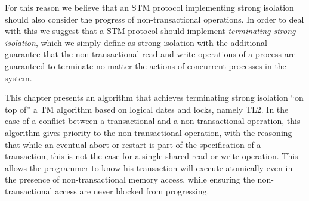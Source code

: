 \documentclass[runningheads,a4paper]{article}
\begin{document}
For this reason we believe that an STM protocol implementing strong
isolation should also consider the progress of non-transactional operations.
In order to deal with this we suggest that a STM protocol should implement
\emph{terminating strong isolation}, which we simply define as strong isolation
with the additional guarantee that the non-transactional read and write
operations of a process are guaranteed to terminate no matter the actions of
concurrent processes in the system.







This chapter presents an algorithm that achieves terminating strong 
isolation  ``on top of'' a TM algorithm based on logical dates and locks, 
namely  TL2. 
In the case of a conflict between a transactional and a non-transactional
operation, this algorithm gives priority to 
the non-transactional operation, 
with the reasoning that while an eventual abort or restart is part of the 
specification of a transaction,
this is not the case for a single shared read or write operation. 
This allows the programmer to know his transaction will execute atomically even
in the presence of non-transactional memory access, while ensuring the non-transactional
access are never blocked from progressing.
\end{document}
